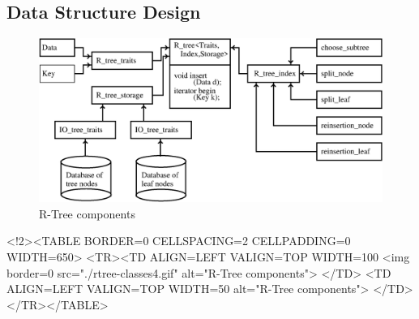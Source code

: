 \subsection{Data Structure Design}

\begin{ccTexOnly}
\begin{figure}
\begin{center}
\includegraphics[width=14cm,clip]{rtree-classes4.eps}
\end{center}
\caption{\label{User:r-tree-design} R-Tree components}
\end{figure}
\end{ccTexOnly}
\begin{ccHtmlOnly}
    <!2><TABLE BORDER=0 CELLSPACING=2 CELLPADDING=0 WIDTH=650>
        <TR><TD ALIGN=LEFT VALIGN=TOP WIDTH=100%
    <img border=0 src="./rtree-classes4.gif" alt="R-Tree components">
    </TD>
    <TD ALIGN=LEFT VALIGN=TOP WIDTH=50%
alt="R-Tree components">
      </TD></TR></TABLE>
\end{ccHtmlOnly}

